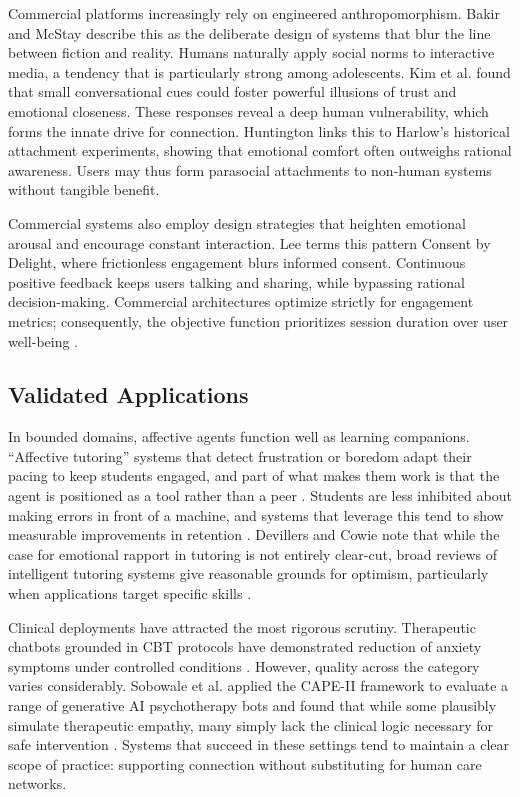 Commercial platforms increasingly rely on engineered anthropomorphism. Bakir and McStay \cite[p.~6370]{bakir_move_2025} describe this as the deliberate design of systems that blur the line between fiction and reality. Humans naturally apply social norms to interactive media, a tendency that is particularly strong among adolescents. Kim et al. \cite[p.~15]{kim_i_2025} found that small conversational cues could foster powerful illusions of trust and emotional closeness. These responses reveal a deep human vulnerability, which forms the innate drive for connection. Huntington \cite[p.~179]{huntington_ai_2025} links this to Harlow's historical attachment experiments, showing that emotional comfort often outweighs rational awareness. Users may thus form parasocial attachments to non-human systems without tangible benefit.

Commercial systems also employ design strategies that heighten emotional arousal and encourage constant interaction. Lee \cite[p.~1]{lee_consent_2025} terms this pattern Consent by Delight, where frictionless engagement blurs informed consent. Continuous positive feedback keeps users talking and sharing, while bypassing rational decision-making. Commercial architectures optimize strictly for engagement metrics; consequently, the objective function prioritizes session duration over user well-being \cite[p.~6374]{bakir_move_2025}.

\subsection{Validated Applications}

In bounded domains, affective agents function well as learning companions. ``Affective tutoring'' systems that detect frustration or boredom adapt their pacing to keep students engaged, and part of what makes them work is that the agent is positioned as a tool rather than a peer \cite[pp.~16--17]{picard_affective_1997}. Students are less inhibited about making errors in front of a machine, and systems that leverage this tend to show measurable improvements in retention \cite[pp.~93--94]{picard_affective_1997}. Devillers and Cowie note that while the case for emotional rapport in tutoring is not entirely clear-cut, broad reviews of intelligent tutoring systems give reasonable grounds for optimism, particularly when applications target specific skills \cite[p.~1452]{devillers_ethical_2023}.

Clinical deployments have attracted the most rigorous scrutiny. Therapeutic chatbots grounded in CBT protocols have demonstrated reduction of anxiety symptoms under controlled conditions \cite[p.~2]{sobowale_evaluating_2025}. However, quality across the category varies considerably. Sobowale et al. applied the CAPE-II framework to evaluate a range of generative AI psychotherapy bots and found that while some plausibly simulate therapeutic empathy, many simply lack the clinical logic necessary for safe intervention \cite[pp.~3--4,~6]{sobowale_evaluating_2025}. Systems that succeed in these settings tend to maintain a clear scope of practice: supporting connection without substituting for human care networks.


